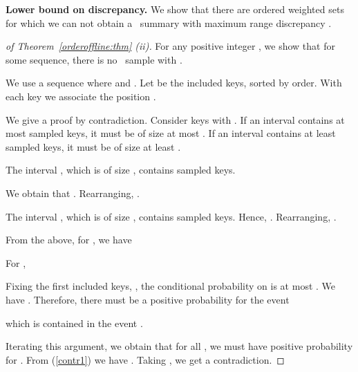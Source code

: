 \documentclass[11pt]{article}
\begin{document}
\medskip
\noindent
{\bf Lower bound on discrepancy.}
We show that there are ordered weighted sets 
for which we can not obtain a \varopt\ summary with 
maximum range discrepancy .

\begin{proof}[of Theorem~\ref{orderoffline:thm} (ii)]


For any positive integer , 
we show that for some sequence, there is no \varopt\ sample with
.

We use a sequence where  and .
Let
 be the included keys, sorted by order.
With each key  we associate the position 
.

 We give a proof by contradiction.  
Consider keys  with .
If an interval contains at most  sampled keys, it must be of size
at most .
If an interval contains at least  sampled keys,  it must be of
size at least .

The interval , which is of size
, 
contains  sampled keys.

We obtain that .
Rearranging, .

The interval , which is of size
, contains 
 sampled keys.
Hence,
.
Rearranging,
.

 From the above, 
for  , we have



For , 



 Fixing the first  included keys, , 
the conditional probability on  is at most .
We have
.
Therefore, there must be a positive probability for the event

which is contained in the event
.  


 Iterating this argument, we obtain that for all ,
we must have positive probability
for .  
From (\ref{contr1}) 
we have .
Taking , we get a contradiction.
\end{proof}
\end{document}
